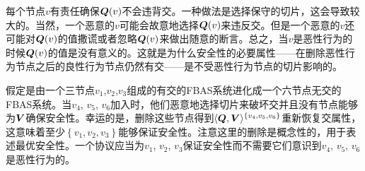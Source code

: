 每个节点$v$有责任确保${\bm Q}(v)$不会违背{\quorum}交。一种做法是选择保守的切片，这会导致较大的{\quorum}。当然，一个恶意的$v$可能会故意地选择${\bm Q}(v)$来违反{\quorum}交。但是一个恶意的$v$还可能对${\bm Q}(v)$的值撒谎或者忽略${\bm Q}(v)$来做出随意的断言。总之，当$v$是恶性行为的时候${\bm Q}(v)$的值是没有意义的。这就是为什么安全性的必要属性——在删除恶性行为节点之后的良性行为节点仍然有{\quorum}交——是不受恶性行为节点的切片影响的。

假定是由一个三节点$v_1$,$v_2$,$v_3$组成的有{\quorum}交的FBAS系统进化成一个六节点无{\quorum}交的FBAS系统。当$v_4$, $v_5$, $v_6$加入时，他们恶意地选择切片来破坏{\quorum}交并且没有节点能够为${\bm V}$确保安全性。幸运的是，删除这些节点得到$\langle{\bm Q},{\bm V}\rangle^{\left\{v_4,v_5,v_6\right\}}$重新恢复{\quorum}交属性，这意味着至少$\left\{v_1,v_2,v_3\right\}$能够保证安全性。注意这里的删除是概念性的，用于表述最优安全性。一个协议应当为$v_1$, $v_2$, $v_3$保证安全性而不需要它们意识到$v_4$, $v_5$, $v_6$是恶性行为的。